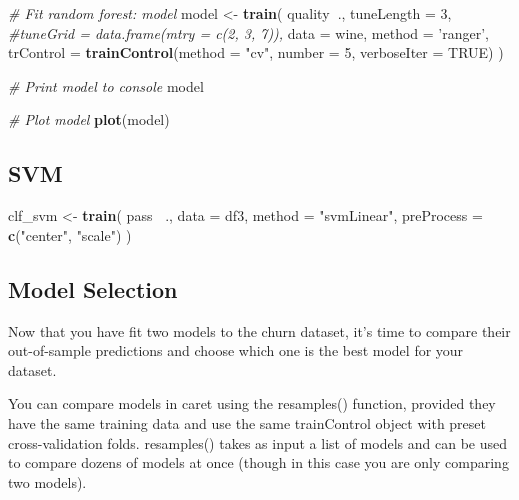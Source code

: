 \documentclass[]{book}
\newenvironment{Shaded}{\begin{snugshade}}{\end{snugshade}}
\newcommand{\KeywordTok}[1]{\textcolor[rgb]{0.13,0.29,0.53}{\textbf{#1}}}
\newcommand{\DataTypeTok}[1]{\textcolor[rgb]{0.13,0.29,0.53}{#1}}
\newcommand{\DecValTok}[1]{\textcolor[rgb]{0.00,0.00,0.81}{#1}}
\newcommand{\StringTok}[1]{\textcolor[rgb]{0.31,0.60,0.02}{#1}}
\newcommand{\CommentTok}[1]{\textcolor[rgb]{0.56,0.35,0.01}{\textit{#1}}}
\newcommand{\OtherTok}[1]{\textcolor[rgb]{0.56,0.35,0.01}{#1}}
\newcommand{\OperatorTok}[1]{\textcolor[rgb]{0.81,0.36,0.00}{\textbf{#1}}}
\newcommand{\NormalTok}[1]{#1}
\begin{document}
\begin{Shaded}
\begin{Highlighting}[]
\CommentTok{# Fit random forest: model}
\NormalTok{model <-}\StringTok{ }\KeywordTok{train}\NormalTok{(}
\NormalTok{  quality}\OperatorTok{~}\NormalTok{.,}
  \DataTypeTok{tuneLength =} \DecValTok{3}\NormalTok{,}
  \CommentTok{#tuneGrid = data.frame(mtry = c(2, 3, 7)),}
  \DataTypeTok{data =}\NormalTok{ wine, }
  \DataTypeTok{method =} \StringTok{'ranger'}\NormalTok{,}
  \DataTypeTok{trControl =} \KeywordTok{trainControl}\NormalTok{(}\DataTypeTok{method =} \StringTok{"cv"}\NormalTok{, }\DataTypeTok{number =} \DecValTok{5}\NormalTok{, }\DataTypeTok{verboseIter =} \OtherTok{TRUE}\NormalTok{)}
\NormalTok{)}

\CommentTok{# Print model to console}
\NormalTok{model}

\CommentTok{# Plot model}
\KeywordTok{plot}\NormalTok{(model)}
\end{Highlighting}
\end{Shaded}

\subsection{SVM}\label{svm-1}

\begin{Shaded}
\begin{Highlighting}[]
\NormalTok{clf_svm <-}\StringTok{ }\KeywordTok{train}\NormalTok{(}
\NormalTok{  pass }\OperatorTok{~}\NormalTok{., }
  \DataTypeTok{data =}\NormalTok{ df3, }
  \DataTypeTok{method =} \StringTok{"svmLinear"}\NormalTok{,}
  \DataTypeTok{preProcess =} \KeywordTok{c}\NormalTok{(}\StringTok{"center"}\NormalTok{, }\StringTok{"scale"}\NormalTok{)}
\NormalTok{                 )}
\end{Highlighting}
\end{Shaded}

\subsection{Model Selection}\label{model-selection-1}

Now that you have fit two models to the churn dataset, it's time to
compare their out-of-sample predictions and choose which one is the best
model for your dataset.

You can compare models in caret using the resamples() function, provided
they have the same training data and use the same trainControl object
with preset cross-validation folds. resamples() takes as input a list of
models and can be used to compare dozens of models at once (though in
this case you are only comparing two models).
\end{document}
